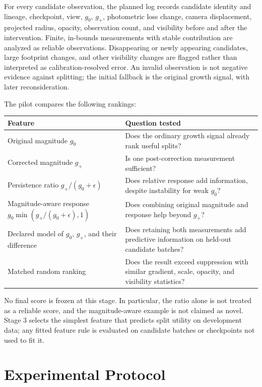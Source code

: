 \documentclass[10pt]{article}
\begin{document}
For every candidate observation, the planned log records candidate identity
and lineage, checkpoint, view, \(g_0\), \(g_+\), photometric loss change,
camera displacement, projected radius, opacity, observation count, and
visibility before and after the intervention. Finite, in-bounds measurements
with stable contribution are analyzed as reliable observations. Disappearing
or newly appearing candidates, large footprint changes, and other visibility
changes are flagged rather than interpreted as calibration-resolved error.
An invalid observation is not negative evidence against splitting; the initial
fallback is the original growth signal, with later reconsideration.

The pilot compares the following rankings:
\begin{center}
\small
\begin{tabularx}{0.96\linewidth}{@{}lY@{}}
\toprule
\textbf{Feature} & \textbf{Question tested}\\
\midrule
Original magnitude \(g_0\) & Does the ordinary growth signal already rank useful splits?\\
Corrected magnitude \(g_+\) & Is one post-correction measurement sufficient?\\
Persistence ratio \(g_+/(g_0+\epsilon)\) & Does relative response add information, despite instability for weak \(g_0\)?\\
Magnitude-aware response \(g_0\min(g_+/(g_0+\epsilon),1)\) & Does combining original magnitude and response help beyond \(g_+\)?\\
Declared model of \(g_0\), \(g_+\), and their difference & Does retaining both measurements add predictive information on held-out candidate batches?\\
Matched random ranking & Does the result exceed suppression with similar gradient, scale, opacity, and visibility statistics?\\
\bottomrule
\end{tabularx}
\end{center}
No final score is frozen at this stage. In particular, the ratio alone is not
treated as a reliable score, and the magnitude-aware example is not claimed as
novel. Stage 3 selects the simplest feature that predicts split utility on
development data; any fitted feature rule is evaluated on candidate batches
or checkpoints not used to fit it.

\section{Experimental Protocol}
\end{document}
